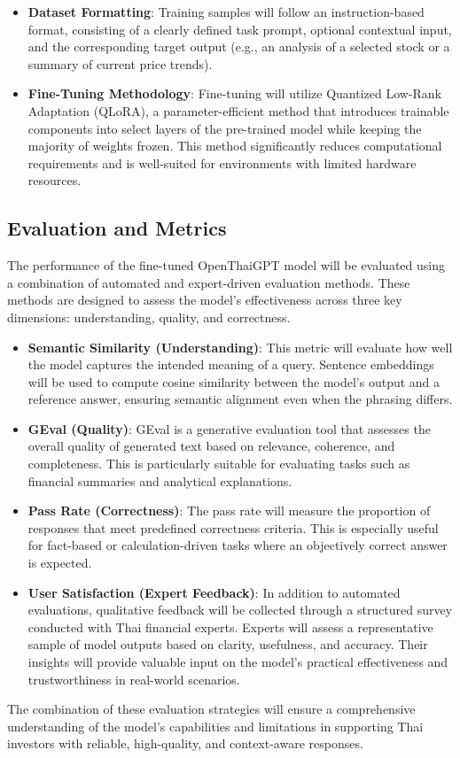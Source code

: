 \begin{itemize}[leftmargin=60pt]
    \item \textbf{Dataset Formatting}: Training samples will follow an instruction-based format, consisting of a clearly defined task prompt, optional contextual input, and the corresponding target output (e.g., an analysis of a selected stock or a summary of current price trends).
    \item \textbf{Fine-Tuning Methodology}: Fine-tuning will utilize Quantized Low-Rank Adaptation (QLoRA), a parameter-efficient method that introduces trainable components into select layers of the pre-trained model while keeping the majority of weights frozen. This method significantly reduces computational requirements and is well-suited for environments with limited hardware resources\cite{QLoRAMedium2023}.
\end{itemize}

\subsection{Evaluation and Metrics}
\label{subsection:evaluation-and-metrics}

The performance of the fine-tuned OpenThaiGPT model will be evaluated using a combination of automated and expert-driven evaluation methods. 
These methods are designed to assess the model's effectiveness across three key dimensions: understanding, quality, and correctness.

\begin{itemize}[leftmargin=60pt]
    \item \textbf{Semantic Similarity (Understanding)}: This metric will evaluate how well the model captures the intended meaning of a query. Sentence embeddings will be used to compute cosine similarity between the model’s output and a reference answer, ensuring semantic alignment even when the phrasing differs\cite{SemScore2024}.
    \item \textbf{GEval (Quality)}: GEval is a generative evaluation tool that assesses the overall quality of generated text based on relevance, coherence, and completeness. This is particularly suitable for evaluating tasks such as financial summaries and analytical explanations\cite{GEval2024}.
    \item \textbf{Pass Rate (Correctness)}: The pass rate will measure the proportion of responses that meet predefined correctness criteria. This is especially useful for fact-based or calculation-driven tasks where an objectively correct answer is expected.
    \item \textbf{User Satisfaction (Expert Feedback)}: In addition to automated evaluations, qualitative feedback will be collected through a structured survey conducted with Thai financial experts. Experts will assess a representative sample of model outputs based on clarity, usefulness, and accuracy. Their insights will provide valuable input on the model's practical effectiveness and trustworthiness in real-world scenarios.
\end{itemize}

The combination of these evaluation strategies will ensure a comprehensive understanding of the model’s capabilities and limitations in supporting Thai investors with reliable, high-quality, and context-aware responses.
